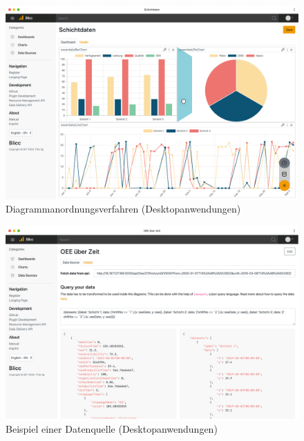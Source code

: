 \begin{figure}[h]
    \centering
    \includegraphics[scale=0.14]{img/desktop/Desktop}
    \caption{Diagrammanordnungsverfahren (Desktopanwendungen)}
    \label{figure:positionierungeinesneuendiagramms}
\end{figure}

\begin{figure}[h]
    \centering
    \includegraphics[scale=0.14]{img/desktop/DesktopDataSource}
    \caption{Beispiel einer Datenquelle (Desktopanwendungen)}
    \label{figure:beispieleinerdatenquelle}
\end{figure}

